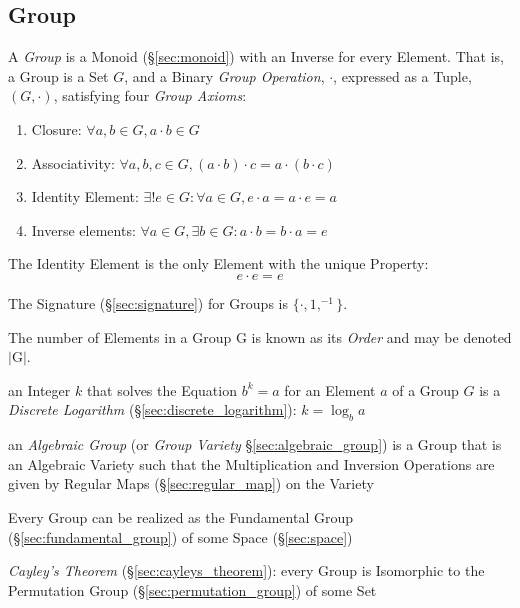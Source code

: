 


\subsection{Group}\label{sec:group}

A \emph{Group} is a Monoid (\S\ref{sec:monoid}) with an Inverse for
every Element. That is, a Group is a Set $G$, and a Binary \emph{Group
  Operation}, $\cdot$, expressed as a Tuple, $(G,\cdot)$, satisfying
four \emph{Group Axioms}:
\begin{enumerate}
    \item Closure: $\forall a,b \in G, a \cdot b \in G$
    \item Associativity: $\forall a,b,c \in G, (a \cdot b) \cdot c = a
      \cdot (b \cdot c)$
    \item Identity Element: $\exists! e \in G : \forall a \in G,
      e \cdot a = a \cdot e = a$
    \item Inverse elements: $\forall a \in G, \exists b \in G :
      a \cdot b = b \cdot a = e$
\end{enumerate}
The Identity Element is the only Element with the unique Property:
\[
    e \cdot e = e
\]

The Signature (\S\ref{sec:signature}) for Groups is $\{\cdot, 1,
^{-1}\}$.

The number of Elements in a Group $\mathrm{G}$ is known as its
\emph{Order} and may be denoted $|\mathrm{G}|$.

an Integer $k$ that solves the Equation $b^k = a$ for an Element $a$ of a Group
$G$ is a \emph{Discrete Logarithm} (\S\ref{sec:discrete_logarithm}): $k =
\log_b a$

an \emph{Algebraic Group} (or \emph{Group Variety} \S\ref{sec:algebraic_group})
is a Group that is an Algebraic Variety such that the Multiplication and
Inversion Operations are given by Regular Maps (\S\ref{sec:regular_map}) on the
Variety

Every Group can be realized as the Fundamental Group
(\S\ref{sec:fundamental_group}) of some Space (\S\ref{sec:space})

\emph{Cayley's Theorem} (\S\ref{sec:cayleys_theorem}): every Group is
Isomorphic to the Permutation Group (\S\ref{sec:permutation_group}) of
some Set

